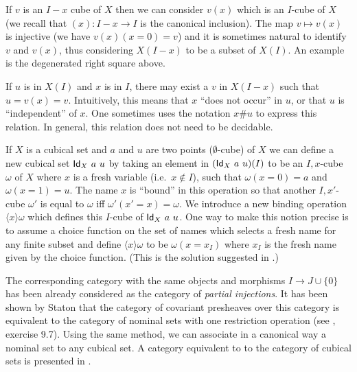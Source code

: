 \documentclass[10pt,a4paper]{article}
\newcommand{\Id}{{\sf Id}}
\newcommand{\set}[1]{\{#1\}}
\newcommand{\es}{\emptyset}
\newcommand{\bind}[2]{{\langle}#1{\rangle}#2}
\begin{document}
If $v$ is an $I-x$ cube of $X$ then we can consider $v(x)$ which is an
$I$-cube of $X$ (we recall that $(x):I-x\to I$ is the canonical
inclusion). The map $v\longmapsto v(x)$ is injective (we have
$v(x)(x=0) = v$) and it is sometimes natural to identify $v$ and
$v(x)$, thus considering $X(I-x)$ to be a subset of $X(I)$. An example
is the degenerated right square above.

 If $u$ is in $X(I)$ and $x$ is in $I$, there may exist a $v$ in $X(I-x)$ such that
$u = v(x) = v$.  Intuitively, this means that $x$ ``does not occur'' in $u$, or that $u$ is
``independent'' of $x$. One sometimes uses the notation $x\#u$ to express this relation. In general, this relation does
not need to be decidable.

 If $X$ is a cubical set and $a$ and $u$ are two points ($\es$-cube) of $X$ we can define a new cubical set $\Id_X~a~u$
by taking an element in $(\Id_X~a~u)(I)$ to be an $I,x$-cube $\omega$ of $X$ where $x$ is
a fresh variable (i.e.\ $x \notin I$), such that $\omega(x=0) = a$ and $\omega(x=1) = u$. The name $x$ is ``bound''
in this operation so that another $I,x'$-cube $\omega'$ is equal to $\omega$
if{f} $\omega'(x'=x) = \omega$.
We introduce a new binding operation $\bind{x}{\omega}$ which defines this $I$-cube of $\Id_X~a~u$.
One way to make this notion precise is to assume a choice function
on the set of names which selects a fresh name for any finite subset and define $\bind{x}{\omega}$ to be $\omega (x=x_I)$ where
$x_I$ is the fresh name given by the choice function. (This is the solution suggested in \cite{Stoughton}.)

\medskip

 The corresponding category with the same objects and morphisms $I \to J\cup\{0\}$ has been already
considered as the category of {\em partial injections}. It has been shown by Staton that the category of covariant
presheaves over this category is equivalent to the category of nominal sets with one restriction operation
(see \cite{pitts}, exercise 9.7). Using the same method, we can associate in a canonical way a nominal set
to any cubical set. A category equivalent to to the category of cubical sets is presented in \cite{Pitts}.
\end{document}
